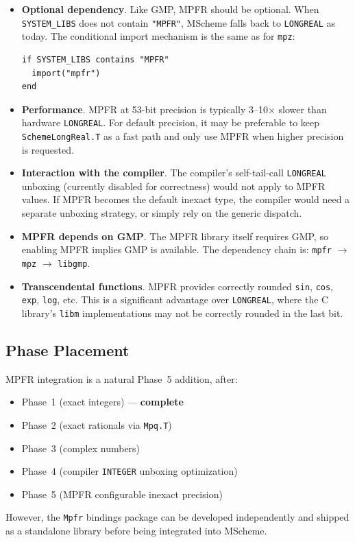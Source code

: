 \documentclass[12pt]{article}
\begin{document}
\begin{itemize}
\item \textbf{Optional dependency}.  Like GMP, MPFR should be
  optional.  When {\tt SYSTEM\_LIBS} does not contain {\tt "MPFR"},
  MScheme falls back to {\tt LONGREAL} as today.  The conditional
  import mechanism is the same as for {\tt mpz}:
\begin{lstlisting}[language={}]
if SYSTEM_LIBS contains "MPFR"
  import("mpfr")
end
\end{lstlisting}

\item \textbf{Performance}.  MPFR at 53-bit precision is
  typically 3--10$\times$ slower than hardware {\tt LONGREAL}.
  For default precision, it may be preferable to keep
  {\tt SchemeLongReal.T} as a fast path and only use MPFR
  when higher precision is requested.

\item \textbf{Interaction with the compiler}.  The compiler's
  self-tail-call {\tt LONGREAL} unboxing (currently disabled
  for correctness) would not apply to MPFR values.  If MPFR
  becomes the default inexact type, the compiler would need
  a separate unboxing strategy, or simply rely on the generic
  dispatch.

\item \textbf{MPFR depends on GMP}.  The MPFR library itself
  requires GMP, so enabling MPFR implies GMP is available.
  The dependency chain is: {\tt mpfr} $\to$ {\tt mpz} $\to$
  {\tt libgmp}.

\item \textbf{Transcendental functions}.  MPFR provides correctly
  rounded {\tt sin}, {\tt cos}, {\tt exp}, {\tt log}, etc.  This
  is a significant advantage over {\tt LONGREAL}, where the C
  library's {\tt libm} implementations may not be correctly
  rounded in the last bit.
\end{itemize}

\subsection{Phase Placement}

MPFR integration is a natural Phase~5 addition, after:
\begin{itemize}[nosep]
\item Phase~1 (exact integers) --- \textbf{complete}
\item Phase~2 (exact rationals via {\tt Mpq.T})
\item Phase~3 (complex numbers)
\item Phase~4 (compiler {\tt INTEGER} unboxing optimization)
\item Phase~5 (MPFR configurable inexact precision)
\end{itemize}

\noindent However, the {\tt Mpfr} bindings package can be
developed independently and shipped as a standalone library
before being integrated into MScheme.
\end{document}
